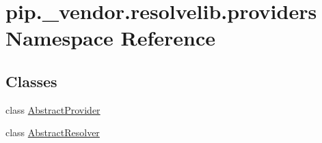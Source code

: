 \hypertarget{namespacepip_1_1__vendor_1_1resolvelib_1_1providers}{}\section{pip.\+\_\+vendor.\+resolvelib.\+providers Namespace Reference}
\label{namespacepip_1_1__vendor_1_1resolvelib_1_1providers}
\subsection*{Classes}
\begin{DoxyCompactItemize}
\item 
class \hyperlink{classpip_1_1__vendor_1_1resolvelib_1_1providers_1_1AbstractProvider}{Abstract\+Provider}
\item 
class \hyperlink{classpip_1_1__vendor_1_1resolvelib_1_1providers_1_1AbstractResolver}{Abstract\+Resolver}
\end{DoxyCompactItemize}
